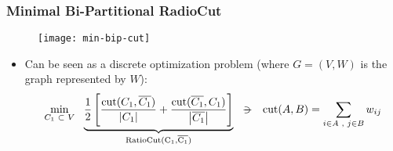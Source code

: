 \begin{frame}
  \frametitle{Minimal Bi-Partitional RadioCut}
  \begin{figure}
    \centering
    \texttt{[image: min-bip-cut]}
  \end{figure}
  \begin{itemize}
  \item Can be seen as a discrete optimization problem (where $G = (V,W)$ is the graph represented by $W$):
    \begin{equation*}
      \min\limits_{\tiny{C_1 \ds{\subset} V}} \ds{}
      \underbrace{      
        \frac{1}{2}
        \left[
          \dfrac{\func{cut}(C_1,\stcomp{C_1})}{\abs{C_1}} +
          \dfrac{\func{cut}(\stcomp{C_1},C_1)}{\abs{\stcomp{C_1}}}
          \right]
        }_{\func{RatioCut(C_1,\stcomp{C_1})}}
      \ds{\suchthat}
      \func{cut}(A,B) = \sum\limits_{\tiny{i \in A \ds{,} j \in B}} w_{ij}
    \end{equation*}
  \end{itemize}
\end{frame}
